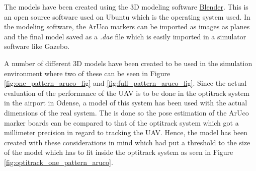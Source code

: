 \documentclass[../Head/report.tex]{subfiles}
\begin{document}
The models have been created using the 3D modeling software \href{https://www.blender.org/}{Blender}. This is an open source software used on Ubuntu which is the operating system used. In the modeling software, the ArUco markers can be imported as images as planes and the final model saved as a \textit{.dae} file which is easily imported in a simulator software like Gazebo.    

A number of different 3D models have been created to be used in the simulation environment where two of these can be seen in Figure \ref{fig:one_pattern_aruco_fig} and \ref{fig:full_pattern_aruco_fig}. Since the actual evaluation of the performance of the UAV is to be done in the optitrack system in the airport in Odense, a model of this system has been used with the actual dimensions of the real system. The is done so the pose estimation of the ArUco marker boards can be compared to that of the optitrack system which got a millimeter precision in regard to tracking the UAV. Hence, the model has been created with these considerations in mind which had put a threshold to the size of the model which has to fit inside the optitrack system as seen in Figure \ref{fig:optitrack_one_pattern_aruco}. 
\end{document}
